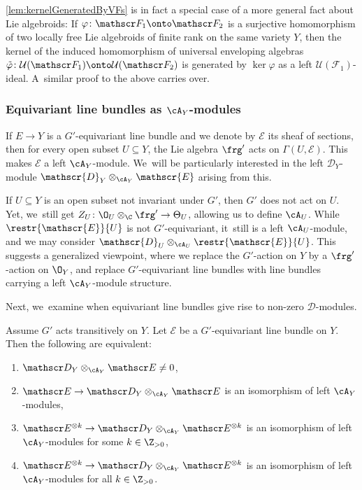 \cref{lem:kernelGeneratedByVFs} is in fact a special case of a more general fact about Lie algebroids: If $\varphi \colon \mathscr F_1 \onto \mathscr F_2$ is a surjective homomorphism of two locally free Lie algebroids of finite rank on the same variety $Y$, then the kernel of the induced homomorphism of universal enveloping algebras $\tilde{\varphi} \colon \mathcal U(\mathscr F_1) \onto \mathcal U(\mathscr F_2)$ is generated by $\ker \varphi$ as a left $\mathcal U(\mathscr F_1)$-ideal. A~similar proof to the above carries over.

\subsubsection*{Equivariant line bundles as \texorpdfstring{$\cA_Y$}{A\_Y}\nobreakdash-mod\-ules} If $E \to Y$ is a $G'$-equivariant line bundle and we denote by $\mathscr{E}$ its sheaf of sections, then for every open subset $U \subseteq Y$, the Lie algebra $\frg'$ acts on $\Gamma(U,\mathscr{E})$. This makes $\mathscr{E}$ a left $\cA_Y$\nobreakdash-mod\-ule. We~will be particularly interested in the left $\mathscr D_Y$\nobreakdash-mod\-ule
$\mathscr{D}_Y \otimes_{\cA_Y} \mathscr{E}$ arising from this.

\begin{rmk}
If $U \subseteq Y$ is an open subset not invariant under $G'$, then $G'$ does not act on $U$. Yet, we~still get $Z_U \colon \O_U \otimes_\C \frg' \to \Theta_U$, allowing us to define $\cA_U$.
While $\restr{\mathscr{E}}{U}$ is not $G'$-equivariant, it~still is a left $\cA_U$\nobreakdash-mod\-ule, and we may consider $\mathscr{D}_U \otimes_{\cA_U} \restr{\mathscr{E}}{U}$. This suggests a generalized viewpoint, where we replace the $G'$-action on $Y$ by a $\frg'$\nobreakdash-action on $\O_Y$, and replace $G'$-equivariant line bundles with line bundles carrying a left $\cA_Y$\nobreakdash-mod\-ule structure.
\end{rmk}

Next, we~examine when equivariant line bundles give rise to non-zero $\mathscr{D}$\nobreakdash-mod\-ules.

\begin{prop} \label{prop:nonZeroIndependentOfPower}
Assume $G'$ acts transitively on $Y$. Let $\mathscr{E}$ be a $G'$-equivariant line bundle on $Y$. Then the following are equivalent:
\begin{enumerate}
\item\label{item:nonZero} $\mathscr D_Y \otimes_{\cA_Y} \mathscr E \neq 0$, 
\item\label{item:natIsom} $\mathscr E \to \mathscr D_Y \otimes_{\cA_Y} \mathscr E$ is an isomorphism of left $\cA_Y$\nobreakdash-mod\-ules,
\item\label{item:natIsomSomePower} $\mathscr E^{\otimes k} \to \mathscr D_Y \otimes_{\cA_Y} \mathscr E^{\otimes k}$ is an isomorphism of left $\cA_Y$\nobreakdash-mod\-ules for some $k \in \Z_{>0}$,
\item\label{item:natIsomAllPowers} $\mathscr E^{\otimes k} \to \mathscr D_Y \otimes_{\cA_Y} \mathscr E^{\otimes k}$ is an isomorphism of left $\cA_Y$\nobreakdash-mod\-ules for all $k \in \Z_{>0}$.
\end{enumerate}
\end{prop}

